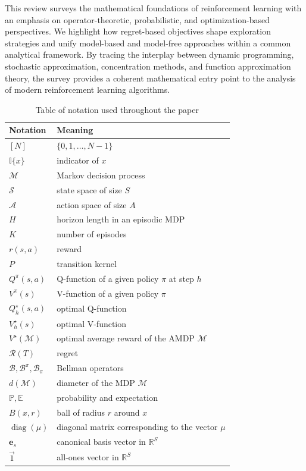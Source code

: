 \documentclass{article}
\numberwithin{equation}{section}
\newcommand{\cA}{\mathcal{A}}
\newcommand{\cS}{\mathcal{S}}
\newcommand{\one}[1]{\mathbb{I}\{#1\}}
\begin{document}
\par
This review surveys the mathematical foundations of reinforcement learning with an emphasis on operator-theoretic, probabilistic, and optimization-based perspectives. We highlight how regret-based objectives shape exploration strategies and unify model-based and model-free approaches within a common analytical framework. By tracing the interplay between dynamic programming, stochastic approximation, concentration methods, and function approximation theory, the survey provides a coherent mathematical entry point to the analysis of modern reinforcement learning algorithms.

\begin{table}[ht]
\centering
\caption{Table of notation used throughout the paper}
\label{tab:notation}
\begin{tabular}{ll}
\toprule
\textbf{Notation} & \textbf{Meaning} \\
\midrule
\([N]\)            & \(\{0,1,\ldots,N-1\}\) \\
\(\one{x}\) & indicator of $x$\\
\(\mathcal{M}\) & Markov decision process\\
\( \cS \)           &state space of size \( S \) \\
\( \cA \)           & action space of size \( A \) \\
\( H \) & horizon length in an episodic MDP\\
\( K \)           & number of episodes \\
\( r(s, a) \)   & reward \\
\(P\) & transition kernel  \\
\( Q^\pi(s, a) \) & Q-function of a given policy \(\pi\) at step \( h \) \\
\( V^\pi(s) \)  & V-function of a given policy \(\pi\) \\
\( Q_h^\star(s, a) \) & optimal Q-function   \\
\( V_h^\star(s) \)    & optimal V-function \\
\( V^{\star}(\mathcal{M}) \) & optimal average reward of the AMDP \(\mathcal{M}\)\\
\( \mathcal{R}(T) \) & regret \\
\(\mathcal{B}, \mathcal{B}^\pi, \mathcal{B}_\pi\)  & Bellman operators \\
\( d(\mathcal{M}) \) & diameter of the MDP \(\mathcal{M}\)\\
\(\mathbb{P},\mathbb{E}\) & probability and expectation\\
\(B(x, r)\) & ball of radius $r$ around $x$ \\
\(\operatorname{diag}(\mu)\) & diagonal matrix corresponding to the vector \(\mu\)\\
\(\mathbf{e}_s\) & canonical basis vector in $\mathbb{R}^S$\\
\(\vec{1}\) & all-ones vector in $\mathbb{R}^S$\\
\bottomrule
\end{tabular}
\end{table}
\end{document}
